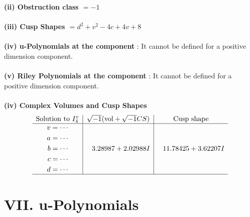 \documentclass[1p]{elsarticle_modified}
\theoremstyle{definition}
\newcommand{\I}{\sqrt{-1}}
\begin{document}
\flushleft \textbf{(ii) Obstruction class $= -1$}\\~\\
\flushleft \textbf{(iii) Cusp Shapes $= d^2+v^2-4 c+4 v+8$}\\~\\
\flushleft \textbf{(iv) u-Polynomials at the component} : It cannot be defined for a positive dimension component.\\~\\
\flushleft \textbf{(v) Riley Polynomials at the component} : It cannot be defined for a positive dimension component.\\~\\
\newpage\flushleft \textbf{(iv) Complex Volumes and Cusp Shapes}
$$\begin{array}{c|c|c} 
\text{Solution to }I^v_{4}& \I (\text{vol} + \sqrt{-1}CS) & \text{Cusp shape}\\
 \hline 
\begin{aligned}
v &= \cdots \\
a &= \cdots \\
b &= \cdots \\
c &= \cdots \\
d &= \cdots\end{aligned}
 & \phantom{-}3.28987 + 2.02988 I & \phantom{-}11.78425 + 3.62207 I\\
 \hline 
 \end{array}
$$
\newpage\renewcommand{\arraystretch}{1}
\centering \section*{ VII. u-Polynomials}
\end{document}

